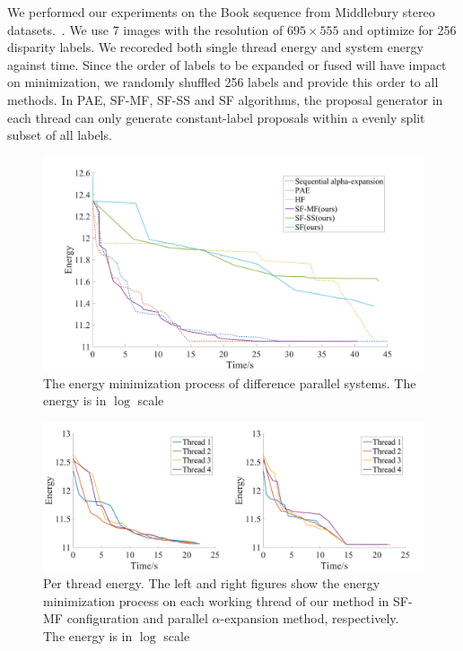 
We performed our experiments on the Book sequence from Middlebury
stereo datasets.~\cite{middlebury_stereo}. We use 7 images with the
resolution of $695\times555$ and optimize for 256 disparity labels. We
recoreded both single thread energy and system energy against
time. Since the order of labels to be expanded or fused will have
impact on minimization, we randomly shuffled 256 labels and provide
this order to all methods. In PAE, SF-MF, SF-SS and SF algorithms, the
proposal generator in each thread can only generate constant-label
proposals within a evenly split subset of all labels.

\begin{figure}[tb]
  \includegraphics[width=\columnwidth]{figure/stereo_global.png} \caption{The
  energy minimization process of difference parallel systems. The
  energy is in $\log$ scale} \label{fig:stereo_global}
\end{figure}

\begin{figure}[tb]
  \includegraphics[width=\columnwidth]{figure/stereo_threads.png}
  \caption{Per thread energy. The left and right figures show the
    energy minimization process on each working thread of our method
    in SF-MF configuration and parallel $\alpha$-expansion method,
    respectively. The energy is in $\log$ scale}
  \label{fig:stereo_threads}
\end{figure}


